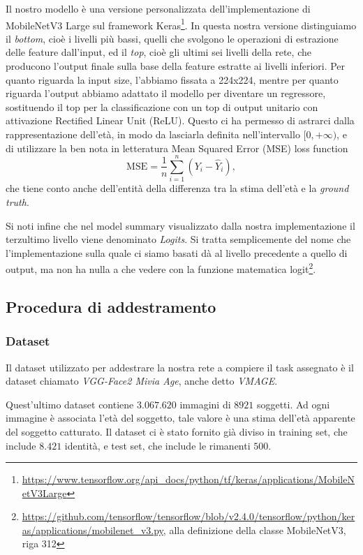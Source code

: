 Il nostro modello è una versione personalizzata dell'implementazione di MobileNetV3 Large sul framework Keras\footnote{\url{https://www.tensorflow.org/api_docs/python/tf/keras/applications/MobileNetV3Large}}. In questa nostra versione distinguiamo il \emph{bottom}, cioè i livelli più bassi, quelli che svolgono le operazioni di estrazione delle feature dall'input, ed il \emph{top}, cioè gli ultimi sei livelli della rete, che producono l'output finale sulla base della feature estratte ai livelli inferiori. Per quanto riguarda la input size, l'abbiamo fissata a 224x224, mentre per quanto riguarda l'output abbiamo adattato il modello per diventare un regressore, sostituendo il top per la classificazione con un top di output unitario con attivazione Rectified Linear Unit (ReLU). Questo ci ha permesso di astrarci dalla rappresentazione dell'età, in modo da lasciarla definita nell'intervallo \([0, +\infty)\), e di utilizzare la ben nota in letteratura Mean Squared Error (MSE) loss function
\begin{displaymath}
\text{MSE} = \frac{1}{n} \sum_{i=1}^{n} \left(Y_i - \hat{Y}_i\right),
\end{displaymath}
che tiene conto anche dell'entità della differenza tra la stima dell'età e la \emph{ground truth}.

Si noti infine che nel model summary visualizzato dalla nostra implementazione il terzultimo livello viene denominato \emph{Logits}. Si tratta semplicemente del nome che l'implementazione sulla quale ci siamo basati dà al livello precedente a quello di output, ma non ha nulla a che vedere con la funzione matematica logit\footnote{\url{https://github.com/tensorflow/tensorflow/blob/v2.4.0/tensorflow/python/keras/applications/mobilenet_v3.py}, alla definizione della classe MobileNetV3, riga 312}.

\subsection{Procedura di addestramento}
\subsubsection{Dataset}
\label{subsubsec:dataset}

Il dataset utilizzato per addestrare la nostra rete a compiere il task assegnato è il dataset chiamato \emph{VGG-Face2 Mivia Age}, anche detto \emph{VMAGE}\cite{miviaage}.

Quest'ultimo dataset contiene $3.067.620$ immagini di $8921$ soggetti. Ad ogni immagine è associata l'età del soggetto, tale valore è una stima dell'età apparente del soggetto catturato.
Il dataset ci è stato fornito già diviso in training set, che include $8.421$ identità, e test set, che include le rimanenti $500$.

